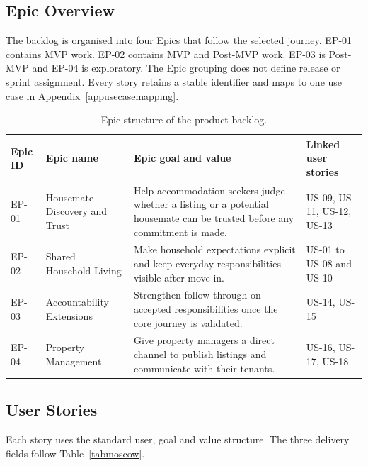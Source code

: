 \documentclass[11pt,a4paper]{article}
\begin{document}
\subsection{Epic Overview}

The backlog is organised into four Epics that follow the selected journey. EP-01 contains MVP work. EP-02 contains MVP and Post-MVP work. EP-03 is Post-MVP and EP-04 is exploratory. The Epic grouping does not define release or sprint assignment. Every story retains a stable identifier and maps to one use case in Appendix~\ref{appusecasemapping}.

\begin{table}[H]
    \centering
    \small
    \caption{Epic structure of the product backlog.}
    \begin{tabularx}{\textwidth}{@{}L{1.4cm}L{3.6cm}Y L{3.4cm}@{}}
        \toprule
        Epic ID & Epic name & Epic goal and value & Linked user stories\\
        \midrule
        EP-01 & Housemate Discovery and Trust & Help accommodation seekers judge whether a listing or a potential housemate can be trusted before any commitment is made. & US-09, US-11, US-12, US-13\\
        EP-02 & Shared Household Living & Make household expectations explicit and keep everyday responsibilities visible after move-in. & US-01 to US-08 and US-10\\
        EP-03 & Accountability Extensions & Strengthen follow-through on accepted responsibilities once the core journey is validated. & US-14, US-15\\
        EP-04 & Property Management & Give property managers a direct channel to publish listings and communicate with their tenants. & US-16, US-17, US-18\\
        \bottomrule
    \end{tabularx}
    \label{tabepics}
\end{table}

\subsection{User Stories}

Each story uses the standard user, goal and value structure. The three delivery fields follow Table~\ref{tabmoscow}.
\end{document}
